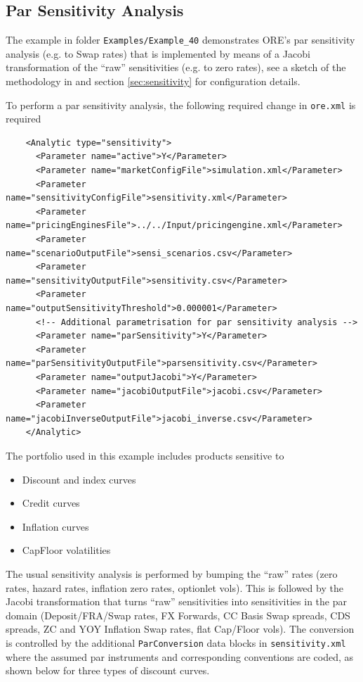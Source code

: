 \subsection{Par Sensitivity Analysis}%
\label{example:40}

The example in folder {\tt Examples/Example\_40}  demonstrates ORE's par sensitivity analysis (e.g. to Swap rates)
that is implemented  by means of a Jacobi transformation of the ``raw'' sensitivities (e.g. to zero rates), see a sketch of the
methodology in \cite{methods} and section \ref{sec:sensitivity} for configuration details.

To perform a par sensitivity analysis, the following required change in {\tt ore.xml} is required

\begin{verbatim}
    <Analytic type="sensitivity">
      <Parameter name="active">Y</Parameter>
      <Parameter name="marketConfigFile">simulation.xml</Parameter>
      <Parameter name="sensitivityConfigFile">sensitivity.xml</Parameter>
      <Parameter name="pricingEnginesFile">../../Input/pricingengine.xml</Parameter>
      <Parameter name="scenarioOutputFile">sensi_scenarios.csv</Parameter>
      <Parameter name="sensitivityOutputFile">sensitivity.csv</Parameter>
      <Parameter name="outputSensitivityThreshold">0.000001</Parameter>
      <!-- Additional parametrisation for par sensitivity analysis -->
      <Parameter name="parSensitivity">Y</Parameter>
      <Parameter name="parSensitivityOutputFile">parsensitivity.csv</Parameter>
      <Parameter name="outputJacobi">Y</Parameter>
      <Parameter name="jacobiOutputFile">jacobi.csv</Parameter>
      <Parameter name="jacobiInverseOutputFile">jacobi_inverse.csv</Parameter>
    </Analytic>
\end{verbatim}

The portfolio used in this example includes products sensitive to
\begin{itemize}
\item Discount and index curves
\item Credit curves
\item Inflation curves
\item CapFloor volatilities
\end{itemize}

The usual sensitivity analysis is performed by bumping the ``raw'' rates (zero rates, hazard rates, inflation zero rates, optionlet vols).
This is followed by the Jacobi transformation that turns ``raw'' sensitivities  into sensitivities in the par domain (Deposit/FRA/Swap rates, FX Forwards, CC Basis Swap spreads,
CDS spreads, ZC and YOY Inflation Swap rates, flat Cap/Floor vols). The conversion is controlled by the additional {\tt ParConversion} data blocks
in {\tt sensitivity.xml} where the assumed par instruments and corresponding conventions are coded, as shown below for three types of discount curves.

